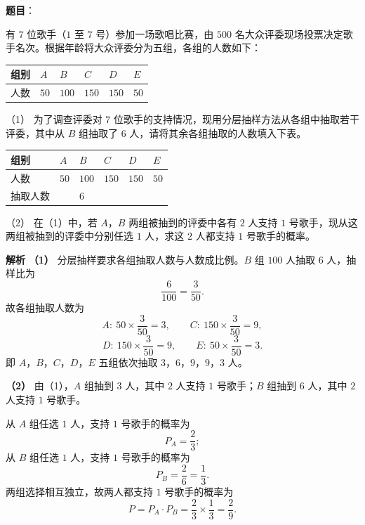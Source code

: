 \begin{answer}

\textbf{题目}：

有 $7$ 位歌手（$1$ 至 $7$ 号）参加一场歌唱比赛，由 $500$ 名大众评委现场投票决定歌手名次。根据年龄将大众评委分为五组，各组的人数如下：

\begin{center}
\begin{tabular}{llllll}
\toprule
组别 & $A$ & $B$ & $C$ & $D$ & $E$ \\
\midrule
人数 & $50$ & $100$ & $150$ & $150$ & $50$ \\
\bottomrule
\end{tabular}
\end{center}

（1） 为了调查评委对 $7$ 位歌手的支持情况，现用分层抽样方法从各组中抽取若干评委，其中从 $B$ 组抽取了 $6$ 人，请将其余各组抽取的人数填入下表。

\begin{center}
\begin{tabular}{llllll}
\toprule
组别 & $A$ & $B$ & $C$ & $D$ & $E$ \\
\midrule
人数 & $50$ & $100$ & $150$ & $150$ & $50$ \\
抽取人数 &  & $6$ &  &  &  \\
\bottomrule
\end{tabular}
\end{center}

（2） 在（1）中，若 $A$，$B$ 两组被抽到的评委中各有 $2$ 人支持 $1$ 号歌手，现从这两组被抽到的评委中分别任选 $1$ 人，求这 $2$ 人都支持 $1$ 号歌手的概率。

\textbf{解析}
\textbf{（1）} 分层抽样要求各组抽取人数与人数成比例。$B$ 组 $100$ 人抽取 $6$ 人，抽样比为
\nopagebreak[4]
\[\frac6{100}=\frac3{50}.\]
故各组抽取人数为
\nopagebreak[4]
\[A:\ 50\times\frac3{50}=3,\qquad C:\ 150\times\frac3{50}=9,\]
\nopagebreak[4]
\[D:\ 150\times\frac3{50}=9,\qquad E:\ 50\times\frac3{50}=3.\]
即 $A$，$B$，$C$，$D$，$E$ 五组依次抽取 $3$，$6$，$9$，$9$，$3$ 人。

\textbf{（2）} 由（1），$A$ 组抽到 $3$ 人，其中 $2$ 人支持 $1$ 号歌手；$B$ 组抽到 $6$ 人，其中 $2$ 人支持 $1$ 号歌手。

从 $A$ 组任选 $1$ 人，支持 $1$ 号歌手的概率为
\nopagebreak[4]
\[P_A=\frac23;\]
从 $B$ 组任选 $1$ 人，支持 $1$ 号歌手的概率为
\nopagebreak[4]
\[P_B=\frac26=\frac13.\]
两组选择相互独立，故两人都支持 $1$ 号歌手的概率为
\nopagebreak[4]
\[P=P_A\cdot P_B=\frac23\times\frac13=\frac29.\]



\end{answer}
